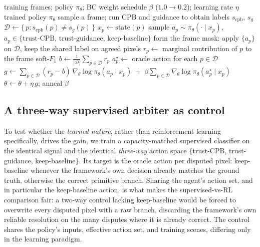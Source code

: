 \documentclass[sn-basic]{sn-jnl}
\begin{document}
\begin{algorithm}[t]
\caption{Training the disputed-pixel arbiter (REINFORCE with a behaviour-cloning auxiliary).}
\label{alg:train}
\begin{algorithmic}[1]
\Require training frames; policy $\pi_\theta$; BC weight schedule $\beta$ ($1.0\!\rightarrow\!0.2$); learning rate $\eta$
\Ensure trained policy $\pi_\theta$
  \State sample a frame; run CPB and guidance to obtain labels $s_{\text{cpb}},\, s_g$
  \State $\mathcal{D} \gets \{\, p : s_{\text{cpb}}(p) \neq s_g(p) \,\}$ 
     \State $x_p \gets \mathrm{state}(p)$ 
     \State sample $a_p \sim \pi_\theta(\cdot \mid x_p)$, \; $a_p \in \{\text{trust-CPB},\,\text{trust-guidance},\,\text{keep-baseline}\}$
  \EndFor
  \State form the frame mask: apply $\{a_p\}$ on $\mathcal{D}$, keep the shared label on agreed pixels
     \State $r_p \gets$ marginal contribution of $p$ to the frame soft-$F_1$ 
  \EndFor
  \State $b \gets \tfrac{1}{|\mathcal{D}|}\sum_{p\in\mathcal{D}} r_p$ 
  \State $a^{\star}_{p} \gets$ oracle action for each $p \in \mathcal{D}$ 
  \State $g \gets \displaystyle\sum_{p\in\mathcal{D}} (r_p-b)\,\nabla_\theta \log \pi_\theta(a_p\mid x_p) \;+\; \beta \!\sum_{p\in\mathcal{D}} \nabla_\theta \log \pi_\theta(a^{\star}_{p} \mid x_p)$
  \State $\theta \gets \theta + \eta\, g$; \quad anneal $\beta$
\EndFor
\end{algorithmic}
\end{algorithm}

\subsection{A three-way supervised arbiter as control}
\label{sec:control}
To test whether the \emph{learned nature}, rather than reinforcement learning
specifically, drives the gain, we train a capacity-matched supervised classifier
on the identical signal and the identical \emph{three-way} action space
$\{$trust-CPB, trust-guidance, keep-baseline$\}$. Its target is the oracle action
per disputed pixel: keep-baseline whenever the framework's own decision already
matches the ground truth, otherwise the correct primitive branch. Sharing the
agent's action set, and in particular the keep-baseline action, is what makes
the supervised-vs-RL comparison fair: a two-way control lacking keep-baseline would be
forced to overwrite every disputed pixel with a raw branch, discarding the framework's
own reliable resolution on the many disputes where it is already correct. The control
shares the policy's inputs, effective action set, and training scenes, differing
only in the learning paradigm.
\end{document}
